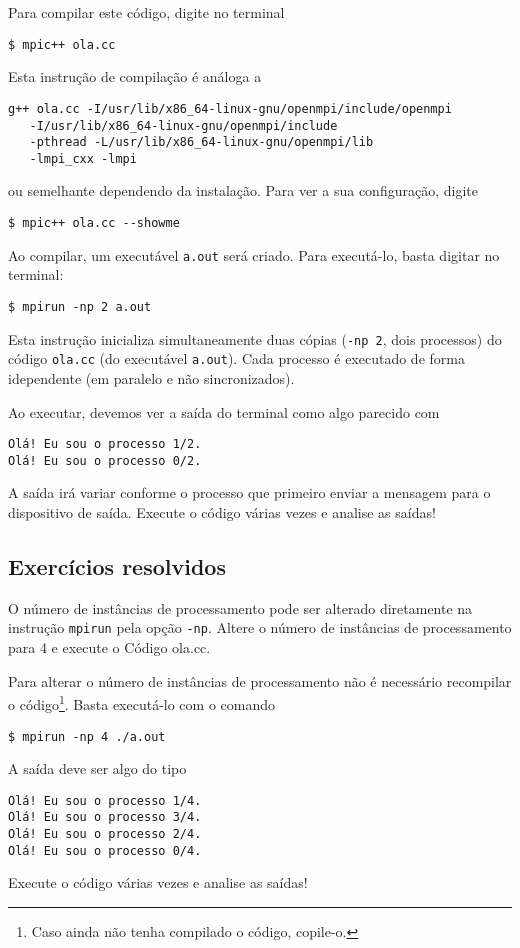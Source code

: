 Para compilar este código, digite no terminal
\begin{verbatim}
$ mpic++ ola.cc
\end{verbatim}
Esta instrução de compilação é análoga a
\begin{verbatim}
g++ ola.cc -I/usr/lib/x86_64-linux-gnu/openmpi/include/openmpi
   -I/usr/lib/x86_64-linux-gnu/openmpi/include 
   -pthread -L/usr/lib/x86_64-linux-gnu/openmpi/lib 
   -lmpi_cxx -lmpi
\end{verbatim}
ou semelhante dependendo da instalação. Para ver a sua configuração, digite
\begin{verbatim}
$ mpic++ ola.cc --showme
\end{verbatim}


Ao compilar, um executável \verb+a.out+ será criado. Para executá-lo, basta digitar no terminal:
\begin{verbatim}
$ mpirun -np 2 a.out
\end{verbatim}
Esta instrução inicializa simultaneamente duas cópias (\verb+-np 2+, dois processos) do código \verb+ola.cc+ (do executável \verb+a.out+). Cada processo é executado de forma idependente (em paralelo e não sincronizados).

Ao executar, devemos ver a saída do terminal como algo parecido com
\begin{verbatim}
Olá! Eu sou o processo 1/2.
Olá! Eu sou o processo 0/2.
\end{verbatim}

A saída irá variar conforme o processo que primeiro enviar a mensagem para o dispositivo de saída. Execute o código várias vezes e analise as saídas!

\subsection{Exercícios resolvidos}

\begin{exeresol}
  O número de instâncias de processamento pode ser alterado diretamente na instrução \verb+mpirun+ pela opção \verb+-np+. Altere o número de instâncias de processamento para 4 e execute o Código ola.cc.
\end{exeresol}
\begin{resol}
  Para alterar o número de instâncias de processamento não é necessário recompilar o código\footnote{Caso ainda não tenha compilado o código, copile-o.}. Basta executá-lo com o comando
\begin{verbatim}
$ mpirun -np 4 ./a.out
\end{verbatim}
  A saída deve ser algo do tipo
\begin{verbatim}
Olá! Eu sou o processo 1/4.
Olá! Eu sou o processo 3/4.
Olá! Eu sou o processo 2/4.
Olá! Eu sou o processo 0/4.
\end{verbatim}
  Execute o código várias vezes e analise as saídas!
\end{resol}

